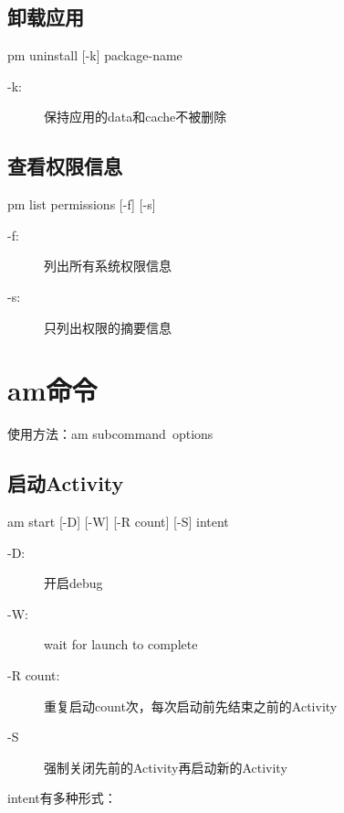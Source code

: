 ﻿\documentclass[a4paper,10pt]{article}
\begin{document}
  \subsection[卸载应用]{卸载应用}
  pm uninstall [-k] \lt package-name\gt

  \begin{description}
    \item[-k:] 保持应用的data和cache不被删除
  \end{description}

  \subsection[查看权限信息]{查看权限信息}
  pm list permissions [-f] [-s]

  \begin{description}
    \item[-f:] 列出所有系统权限信息
    \item[-s:] 只列出权限的摘要信息
  \end{description}


  \section[am - Application Manager]{am命令}
  使用方法：am \lt subcommand\gt\ \lt options\gt

  \subsection[启动Activity]{启动Activity}
  am start [-D] [-W] [-R \lt count\gt] [-S] \lt intent\gt

  \begin{description}
    \item[-D:] 开启debug
    \item[-W:] wait for launch to complete
    \item[-R \lt count\gt:] 重复启动count次，每次启动前先结束之前的Activity
    \item[-S] 强制关闭先前的Activity再启动新的Activity
  \end{description}

  \lt intent\gt 有多种形式：
\end{document}
